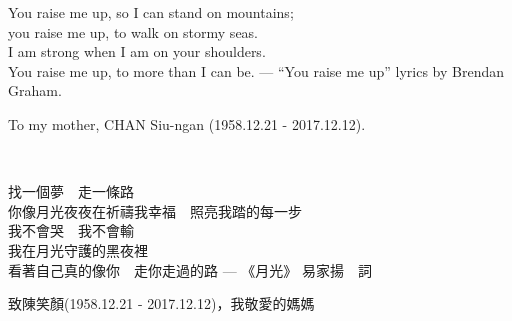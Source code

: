 \noindent You raise me up, so I can stand on mountains;\\
you raise me up, to walk on stormy seas.\\
I am strong when I am on your shoulders.\\
You raise me up, to more than I can be. --- ``You raise me up'' lyrics by Brendan Graham.\\

\par \hfill To my mother, CHAN Siu-ngan (1958.12.21 - 2017.12.12).\\

\par ~\\

\par
\noindent 找一個夢　走一條路　\\
你像月光夜夜在祈禱我幸福　照亮我踏的每一步\\
我不會哭　我不會輸　\\
我在月光守護的黑夜裡\\
看著自己真的像你　走你走過的路 --- 《月光》 易家揚　詞\\

\par \hfill 致陳笑顏(1958.12.21 - 2017.12.12)，我敬愛的媽媽
